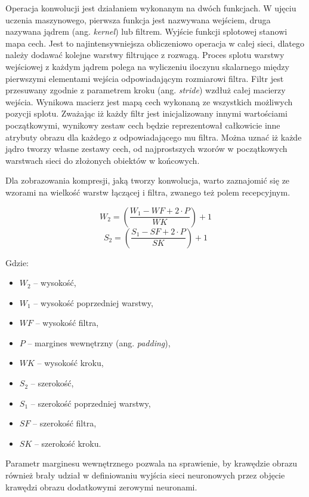 \documentclass[12pt,a4paper,twoside,titlepage,openright]{book}
\begin{document}
\begin{itemize}
\begin{itemize}
Operacja konwolucji jest działaniem wykonanym na dwóch funkcjach. W ujęciu uczenia maszynowego, pierwsza funkcja jest nazwywana wejściem, druga nazywana jądrem (ang. \textit{kernel}) lub filtrem. Wyjście funkcji splotowej stanowi mapa cech. Jest to najintensywniejsza obliczeniowo operacja w całej sieci, dlatego należy dodawać kolejne warstwy filtrujące z rozwagą. Proces splotu warstwy wejściowej z każdym jądrem polega na wyliczeniu iloczynu skalarnego między pierwszymi elementami wejścia odpowiadającym rozmiarowi filtra. Filtr jest przesuwany zgodnie z parametrem kroku (ang. \textit{stride}) wzdłuż całej macierzy wejścia. Wynikowa macierz jest mapą cech wykonaną ze wszystkich możliwych pozycji splotu. Zważając iż każdy filtr jest inicjalizowany innymi wartościami początkowymi, wynikowy zestaw cech będzie reprezentował całkowicie inne atrybuty obrazu dla każdego z odpowiadającego mu filtra. Można uznać iż każde jądro tworzy własne zestawy cech, od najprostszych wzorów w początkowych warstwach sieci do złożonych obiektów w końcowych.

Dla zobrazowania kompresji, jaką tworzy konwolucja, warto zaznajomić się ze wzorami na wielkość warstw łączącej i filtra, zwanego też polem recepcyjnym.


$$ W_2 = (\frac{W_1 - WF + 2 \cdot P}{WK}) + 1 $$ 
$$ S_2 = (\frac{S_1 - SF + 2 \cdot P}{SK}) + 1 $$


Gdzie:
\begin{itemize}
\item $W_2$ -- wysokość,
\item $W_1$ -- wysokość poprzedniej warstwy,
\item $WF$ -- wysokość filtra,
\item $P$ -- margines wewnętrzny (ang. \textit{padding}),
\item $WK$ -- wysokość kroku,
\item $S_2$ -- szerokość,
\item $S_1$ -- szerokość poprzedniej warstwy,
\item $SF$ -- szerokość filtra,
\item $SK$ -- szerokość kroku.
\end{itemize}

Parametr marginesu wewnętrznego pozwala na sprawienie, by krawędzie obrazu również brały udział w definiowaniu wyjścia sieci neuronowych przez objęcie krawędzi obrazu dodatkowymi zerowymi neuronami. 


\end{itemize}
\end{itemize}
\end{document}

